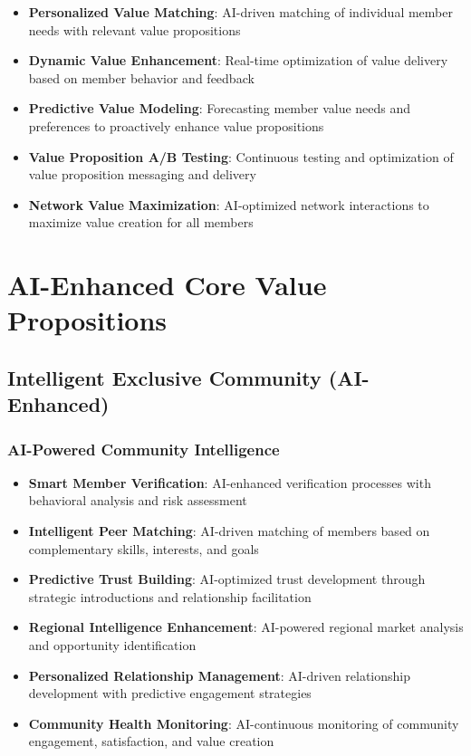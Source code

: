 \begin{itemize}
    \item \textbf{Personalized Value Matching}: AI-driven matching of individual member needs with relevant value propositions
    \item \textbf{Dynamic Value Enhancement}: Real-time optimization of value delivery based on member behavior and feedback
    \item \textbf{Predictive Value Modeling}: Forecasting member value needs and preferences to proactively enhance value propositions
    \item \textbf{Value Proposition A/B Testing}: Continuous testing and optimization of value proposition messaging and delivery
    \item \textbf{Network Value Maximization}: AI-optimized network interactions to maximize value creation for all members
\end{itemize}

\section{AI-Enhanced Core Value Propositions}

\subsection{Intelligent Exclusive Community (AI-Enhanced)}

\subsubsection{AI-Powered Community Intelligence}

\begin{itemize}
    \item \textbf{Smart Member Verification}: AI-enhanced verification processes with behavioral analysis and risk assessment
    \item \textbf{Intelligent Peer Matching}: AI-driven matching of members based on complementary skills, interests, and goals
    \item \textbf{Predictive Trust Building}: AI-optimized trust development through strategic introductions and relationship facilitation
    \item \textbf{Regional Intelligence Enhancement}: AI-powered regional market analysis and opportunity identification
    \item \textbf{Personalized Relationship Management}: AI-driven relationship development with predictive engagement strategies
    \item \textbf{Community Health Monitoring}: AI-continuous monitoring of community engagement, satisfaction, and value creation
\end{itemize}

